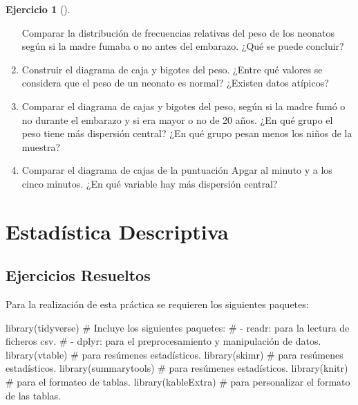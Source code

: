 \documentclass[
  a4paper,
]{scrreport}
\newenvironment{Shaded}{\begin{snugshade}}{\end{snugshade}}
\newcommand{\CommentTok}[1]{\textcolor[rgb]{0.37,0.37,0.37}{#1}}
\newcommand{\FunctionTok}[1]{\textcolor[rgb]{0.28,0.35,0.67}{#1}}
\newcommand{\NormalTok}[1]{\textcolor[rgb]{0.00,0.23,0.31}{#1}}
\theoremstyle{definition}
\newtheorem{exercise}{Ejercicio}[chapter]
\theoremstyle{remark}
\begin{document}
\begin{exercise}[]
\begin{enumerate}
  Comparar la distribución de frecuencias relativas del peso de los
  neonatos según si la madre fumaba o no antes del embarazo. ¿Qué se
  puede concluir?
\item
  Construir el diagrama de caja y bigotes del peso. ¿Entre qué valores
  se considera que el peso de un neonato es normal? ¿Existen datos
  atípicos?
\item
  Comparar el diagrama de cajas y bigotes del peso, según si la madre
  fumó o no durante el embarazo y si era mayor o no de 20 años. ¿En qué
  grupo el peso tiene más dispersión central? ¿En qué grupo pesan menos
  los niños de la muestra?
\item
  Comparar el diagrama de cajas de la puntuación Apgar al minuto y a los
  cinco minutos. ¿En qué variable hay más dispersión central?
\end{enumerate}

\end{exercise}


\hypertarget{estaduxedstica-descriptiva}{%
\chapter{Estadística Descriptiva}\label{estaduxedstica-descriptiva}}

\hypertarget{ejercicios-resueltos-2}{%
\section{Ejercicios Resueltos}\label{ejercicios-resueltos-2}}

Para la realización de esta práctica se requieren los siguientes
paquetes:

\begin{Shaded}
\begin{Highlighting}[]
\FunctionTok{library}\NormalTok{(tidyverse) }
\CommentTok{\# Incluye los siguientes paquetes:}
\CommentTok{\# {-} readr: para la lectura de ficheros csv. }
\CommentTok{\# {-} dplyr: para el preprocesamiento y manipulación de datos.}
\FunctionTok{library}\NormalTok{(vtable) }\CommentTok{\# para resúmenes estadísticos.}
\FunctionTok{library}\NormalTok{(skimr) }\CommentTok{\# para resúmenes estadísticos.}
\FunctionTok{library}\NormalTok{(summarytools) }\CommentTok{\# para resúmenes estadísticos.}
\FunctionTok{library}\NormalTok{(knitr) }\CommentTok{\# para el formateo de tablas.}
\FunctionTok{library}\NormalTok{(kableExtra) }\CommentTok{\# para personalizar el formato de las tablas.}
\end{Highlighting}
\end{Shaded}
\end{document}

